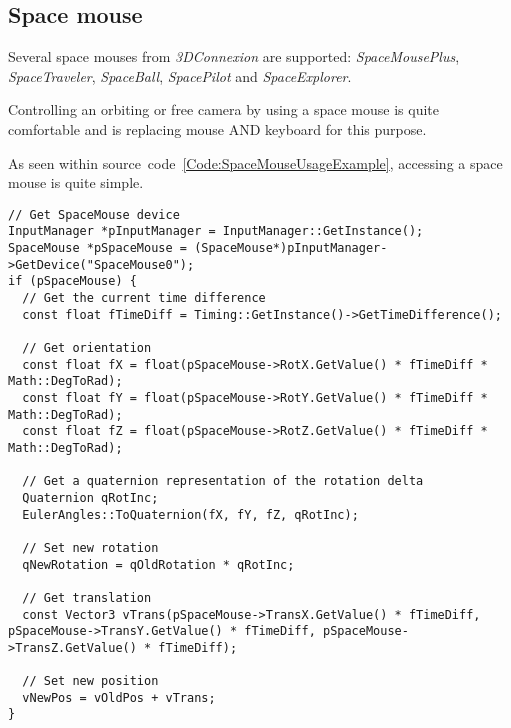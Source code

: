 \subsection{Space mouse}
Several space mouses from \emph{3DConnexion} are supported: \emph{SpaceMousePlus}, \emph{SpaceTraveler}, \emph{SpaceBall}, \emph{SpacePilot} and \emph{SpaceExplorer}.

Controlling an orbiting or free camera by using a space mouse is quite comfortable and is replacing mouse AND keyboard for this purpose.

As seen within source~code~\ref{Code:SpaceMouseUsageExample}, accessing a space mouse is quite simple.
\begin{lstlisting}[float=htb,label=Code:SpaceMouseUsageExample,caption={Space mouse usage example}]
// Get SpaceMouse device
InputManager *pInputManager = InputManager::GetInstance();
SpaceMouse *pSpaceMouse = (SpaceMouse*)pInputManager->GetDevice("SpaceMouse0");
if (pSpaceMouse) {
  // Get the current time difference
  const float fTimeDiff = Timing::GetInstance()->GetTimeDifference();

  // Get orientation
  const float fX = float(pSpaceMouse->RotX.GetValue() * fTimeDiff * Math::DegToRad);
  const float fY = float(pSpaceMouse->RotY.GetValue() * fTimeDiff * Math::DegToRad);
  const float fZ = float(pSpaceMouse->RotZ.GetValue() * fTimeDiff * Math::DegToRad);

  // Get a quaternion representation of the rotation delta
  Quaternion qRotInc;
  EulerAngles::ToQuaternion(fX, fY, fZ, qRotInc);

  // Set new rotation
  qNewRotation = qOldRotation * qRotInc;

  // Get translation
  const Vector3 vTrans(pSpaceMouse->TransX.GetValue() * fTimeDiff, pSpaceMouse->TransY.GetValue() * fTimeDiff, pSpaceMouse->TransZ.GetValue() * fTimeDiff);

  // Set new position
  vNewPos = vOldPos + vTrans;
}
\end{lstlisting}
